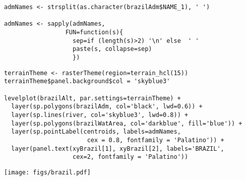 \lstset{language=R}
\begin{lstlisting}
admNames <- strsplit(as.character(brazilAdm$NAME_1), ' ')

admNames <- sapply(admNames,
                 FUN=function(s){
                   sep=if (length(s)>2) '\n' else  ' '
                   paste(s, collapse=sep)
                   })
\end{lstlisting}


\lstset{language=R}
\begin{lstlisting}
terrainTheme <- rasterTheme(region=terrain_hcl(15))
terrainTheme$panel.background$col = 'skyblue3'

levelplot(brazilAlt, par.settings=terrainTheme) +
  layer(sp.polygons(brazilAdm, col='black', lwd=0.6)) +
  layer(sp.lines(river, col='skyblue3', lwd=0.8)) +
  layer(sp.polygons(brazilWatArea, col='darkblue', fill='blue')) +
  layer(sp.pointLabel(centroids, labels=admNames,
                       cex = 0.8, fontfamily = 'Palatino')) +
  layer(panel.text(xyBrazil[1], xyBrazil[2], labels='BRAZIL',
                   cex=2, fontfamily = 'Palatino'))
\end{lstlisting}

\texttt{[image: figs/brazil.pdf]}

